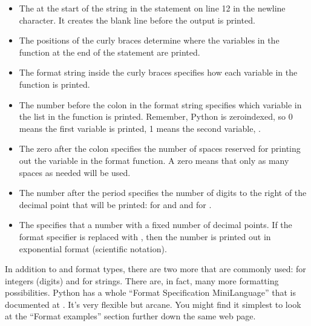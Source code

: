 \documentclass[letterpaper,10pt,english]{sphinxmanual}
\begin{document}
\begin{itemize}
\item {} 
\sphinxAtStartPar
The  at the start of the string in the  statement on line 12 in the newline character.  It creates the blank line before the output is printed.

\item {} 
\sphinxAtStartPar
The positions of the curly braces determine where the variables in the  function at the end of the statement are printed.

\item {} 
\sphinxAtStartPar
The format string inside the curly braces specifies how each variable in the  function is printed.

\item {} 
\sphinxAtStartPar
The number before the colon in the format string specifies which variable in the list in the  function is printed.  Remember, Python is zero\sphinxhyphen{}indexed, so 0 means the first variable is printed, 1 means the second variable, .

\item {} 
\sphinxAtStartPar
The zero after the colon specifies the  number of spaces reserved for printing out the variable in the format function. A zero means that only as many spaces as needed will be used.

\item {} 
\sphinxAtStartPar
The number after the period specifies the number of digits to the right of the decimal point that will be printed:  for  and  and  for .

\item {} 
\sphinxAtStartPar
The  specifies that a number with a fixed number of decimal points.  If the  format specifier is replaced with , then the number is printed out in exponential format (scientific notation).

\end{itemize}

\sphinxAtStartPar
In addition to  and  format types, there are two more that are commonly used:  for integers (digits) and  for strings.  There are, in fact, many more formatting possibilities.  Python has a whole “Format Specification Mini\sphinxhyphen{}Language” that is documented at .  It’s very flexible but arcane.  You might find it simplest to look at the “Format examples” section further down the same web page.
\end{document}
